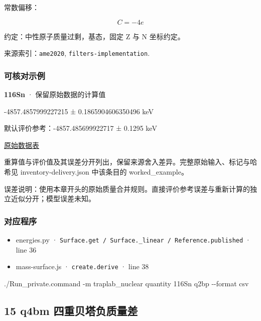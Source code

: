 \documentclass[
  11pt,
  letterpaper,
]{article}
\newenvironment{Shaded}{}{}
\newcommand{\AttributeTok}[1]{\textcolor[rgb]{0.49,0.56,0.16}{#1}}
\newcommand{\ExtensionTok}[1]{#1}
\newcommand{\NormalTok}[1]{#1}
\providecommand{\tightlist}{%
  \setlength{\itemsep}{0pt}\setlength{\parskip}{0pt}}
\begin{document}
常数偏移：

\[
C=-4e
\]

约定：中性原子质量过剩，基态，固定 Z 与 N 坐标约定。

来源索引：\texttt{ame2020}, \texttt{filters-implementation}.

\subsubsection{可核对示例}\label{ux53efux6838ux5bf9ux793aux4f8b-13}

\textbf{116Sn} · 保留原始数据的计算值

-4857.4857999227215 ± 0.1865904606350496 keV

默认评价参考：-4857.485699922717 ± 0.1295 keV

\href{https://www-nds.iaea.org/amdc/ame2020/rct1.mas20.txt}{原始数据表}

重算值与评价值及其误差分开列出，保留来源舍入差异。完整原始输入、标记与哈希见
inventory-delivery.json 中该条目的 worked\_example。

误差说明：使用本章开头的原始质量合并规则。直接评价参考误差与重新计算的独立近似分开；模型误差未知。

\subsubsection{对应程序}\label{ux5bf9ux5e94ux7a0bux5e8f-13}

\begin{itemize}
\tightlist
\item
  energies.py ·
  \texttt{Surface.get\ /\ Surface.\_linear\ /\ Reference.published} ·
  line 36
\item
  mass-surface.js · \texttt{create.derive} · line 38
\end{itemize}

\begin{Shaded}
\begin{Highlighting}[]
\ExtensionTok{./Run\_private.command} \AttributeTok{{-}m}\NormalTok{ traplab\_nuclear quantity 116Sn q2bp }\AttributeTok{{-}{-}format}\NormalTok{ csv}
\end{Highlighting}
\end{Shaded}

\subsection{15 q4bm
四重贝塔负质量差}\label{q4bm-ux56dbux91cdux8d1dux5854ux8d1fux8d28ux91cfux5dee}
\end{document}
